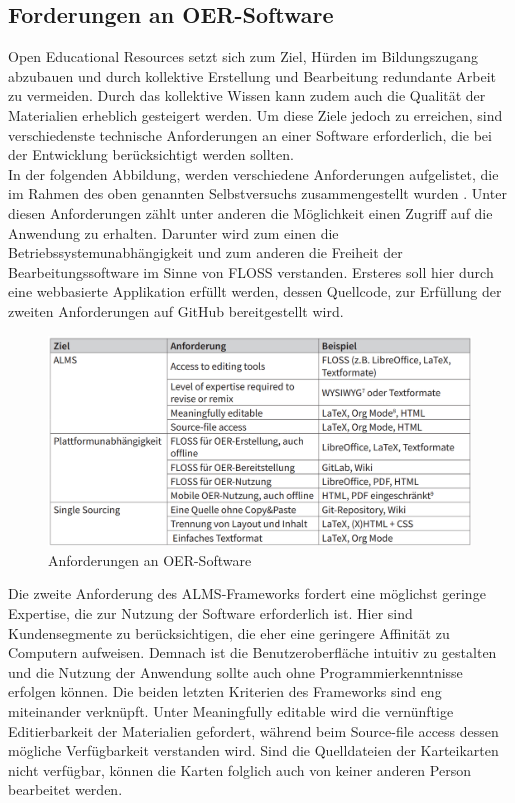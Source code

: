 \subsection{Forderungen an OER-Software}
Open Educational Resources setzt sich zum Ziel, Hürden im Bildungszugang abzubauen und durch kollektive Erstellung und Bearbeitung redundante Arbeit zu vermeiden. Durch das kollektive Wissen kann zudem auch die Qualität der Materialien erheblich gesteigert werden. Um diese Ziele jedoch zu erreichen, sind verschiedenste technische Anforderungen an einer Software erforderlich, die bei der Entwicklung berücksichtigt werden sollten. \\

\noindent In der folgenden Abbildung, werden verschiedene Anforderungen aufgelistet, die im Rahmen des oben genannten Selbstversuchs zusammengestellt wurden \cite{Lechtenborger.2019}. Unter diesen Anforderungen zählt unter anderen die Möglichkeit einen Zugriff auf die Anwendung zu erhalten. Darunter wird zum einen die Betriebssystemunabhängigkeit und zum anderen die Freiheit der Bearbeitungssoftware im Sinne von FLOSS verstanden. Ersteres soll hier durch eine webbasierte Applikation erfüllt werden, dessen Quellcode, zur Erfüllung der zweiten Anforderungen auf GitHub bereitgestellt wird. 

\begin{figure}[h]
\begin{center}
\includegraphics[width = 16cm]{alms_framework.png}
\caption{Anforderungen an OER-Software \cite{Lechtenborger.2019}}
\label{Anforderungen an OER-Software}

\end{center}
\end{figure}


\noindent Die zweite Anforderung des ALMS-Frameworks fordert eine möglichst geringe Expertise, die zur Nutzung der Software erforderlich ist. Hier sind Kundensegmente zu berücksichtigen, die eher eine geringere Affinität zu Computern aufweisen. Demnach ist die Benutzeroberfläche intuitiv zu gestalten und die Nutzung der Anwendung sollte auch ohne Programmierkenntnisse erfolgen können.
Die beiden letzten Kriterien des Frameworks sind eng miteinander verknüpft. Unter \glqq Meaningfully editable\grqq{} wird die vernünftige Editierbarkeit der Materialien gefordert, während beim \glqq Source-file access\grqq{} dessen mögliche Verfügbarkeit verstanden wird. Sind die Quelldateien der Karteikarten nicht verfügbar, können die Karten folglich auch von keiner anderen Person bearbeitet werden. \\

